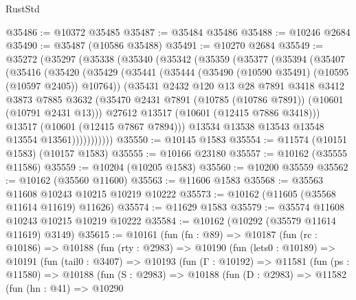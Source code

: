 \begin{lexlean}{RustStd}
\begin{coremodule}
@35486 := @10372 @35485
@35487 := @35484 @35486
@35488 := @10246 @2684
@35490 := @35487 (@10586 @35488)
@35491 := @10270 @2684
@35549 := @35272
    (@35297
      (@35338
        (@35340
          (@35342
            (@35359
              (@35377
                (@35394
                  (@35407
                    (@35416
                      (@35420
                        (@35429
                          (@35441
                            (@35444 (@35490 (@10590 @35491) (@10595 (@10597 @2405)) @10764))
                            (@35431
                              @2432
                              @120
                              @13
                              @28
                              @7891
                              @3418
                              @3412
                              @3873
                              @7885
                              @3632
                              (@35470
                                @2431
                                @7891
                                (@10785 (@10786 @7891))
                                (@10601 (@10791 @2431 @13)))
                              @27612
                              @13517
                              (@10601 (@12415 @7886 @3418)))
                            @13517
                            (@10601 (@12415 @7867 @7894)))
                          @13534
                          @13538
                          @13543
                          @13548
                          @13554
                          @13561)))))))))))
@35550 := @10145 @1583
@35554 := @11574 (@10151 @1583) (@10157 @1583)
@35555 := @10166 @23180
@35557 := @10162 (@35555 @11586)
@35559 := @10204 (@10205 @1583)
@35560 := @10200 @35559
@35562 := @10162 (@35560 @11600)
@35563 := @11606 @1583
@35568 := @35563 @11608 @10243 @10215 @10219 @10222
@35573 := @10162 (@11605 (@35568 @11614 @11619) @11626)
@35574 := @11629 @1583
@35579 := @35574 @11608 @10243 @10215 @10219 @10222
@35584 := @10162 (@10292 (@35579 @11614 @11619) @3149)
@35615 := @10161
    (fun (fn : @89) =>
    @10187
      (fun (rc : @10186) =>
      @10188
        (fun (rty : @2983) =>
        @10190
          (fun (lets0 : @10189) =>
          @10191
            (fun (tail0 : @3407) =>
            @10193
              (fun (Γ : @10192) =>
              @11581
                (fun (ps : @11580) =>
                @10188
                  (fun (S : @2983) =>
                  @10188
                    (fun (D : @2983) =>
                    @11582
                      (fun (hn : @41) =>
                      @10290

\end{coremodule}
\end{lexlean}
